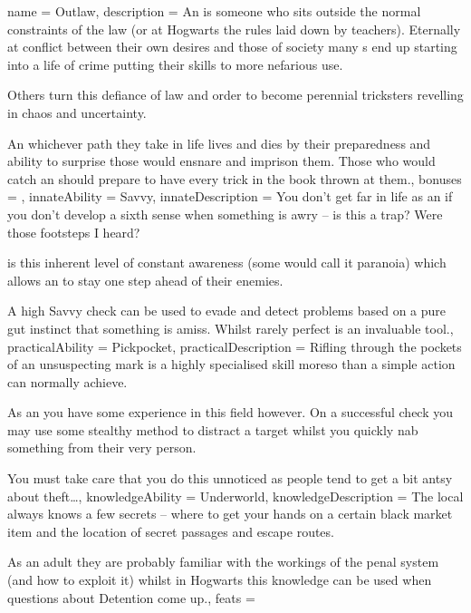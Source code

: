 \archetype
{
	name = Outlaw,
	description = An \bname{} is someone who sits outside the normal constraints of the law (or \comma{} at Hogwarts\comma{} the rules laid down by teachers). Eternally at conflict between their own desires and those of society\comma{} many \bname{}s end up starting into a life of crime\comma{} putting their skills to more nefarious use. 

Others turn this defiance of law and order to become perennial tricksters\comma{} revelling in chaos and uncertainty. 

An \bname{}\comma{} whichever path they take in life\comma{} lives and dies by their preparedness and ability to surprise those would ensnare and imprison them. Those who would catch an \bname{} should prepare to have every trick in the book thrown at them.,
	bonuses = 
,
	innateAbility = Savvy,
	innateDescription = You don’t get far in life as an \bname{} if you don’t develop a sixth sense when something is awry – is this a trap? Were those footsteps I heard? 

 is this inherent level of constant awareness (some would call it paranoia)\comma{} which allows an \bname{} to stay one step ahead of their enemies. 

A high Savvy check can be used to evade and detect problems based on a pure gut instinct that something is amiss. Whilst rarely perfect\comma{}  is an invaluable tool.,
	practicalAbility = Pickpocket,
	practicalDescription = Rifling through the pockets of an unsuspecting mark is a highly specialised skill\comma{} moreso than a simple  action can normally achieve. 

As an \bname{}\comma{} you have some experience in this field however. On a successful  check you may use some stealthy method to distract a target whilst you quickly nab something from their very person. 

You must take care that you do this unnoticed\comma{} as people tend to get a bit antsy about theft…,
	knowledgeAbility = Underworld,
	knowledgeDescription = The local \bname{} always knows a few secrets – where to get your hands on a certain black market item\comma{} and the location of secret passages and escape routes. 

As an adult\comma{} they are probably familiar with the workings of the penal system (and how to exploit it)\comma{} whilst in Hogwarts\comma{} this knowledge can be used when questions about Detention come up.,
	feats = 

}
